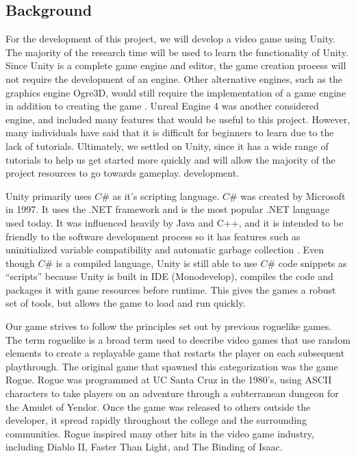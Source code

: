 \documentclass[12pt]{article}       %
\begin{document}
\subsection{Background}
	For the development of this project, we will develop a video game using Unity. The majority of the research time will be used to learn the functionality of Unity. Since Unity is a complete game engine and editor, the game creation process will not require the development of an engine. Other alternative engines, such as the graphics engine Ogre3D, would still require the implementation of a game engine in addition to creating the game \cite{Ogre}. Unreal Engine 4 was another considered engine, and included many features that would be useful to this project. However, many individuals have said that it is difficult for beginners to learn due to the lack of tutorials. Ultimately, we settled on Unity, since it has a wide range of tutorials to help us get started more quickly and will allow the majority of the project resources to go towards gameplay. development.

        Unity primarily uses $C\#$ as it’s scripting language. $C\#$ was created by Microsoft in 1997. It uses the .NET framework and is the most popular .NET language used today. It was influenced heavily by Java and C++, and it is intended to be friendly to the software development process so it has features such as uninitialized variable compatibility and automatic garbage collection \cite{Cadet}. Even though $C\#$ is a compiled language, Unity is still able to use $C\#$ code snippets as “scripts” because Unity is built in IDE (Monodevelop), compiles the code and packages it with game resources before runtime. This gives the games a robust set of tools, but allows the game to load and run quickly. \cite{Moles} 

	Our game strives to follow the principles set out by previous roguelike games. The term roguelike is a broad term used to describe video games that use random elements to create a replayable game that restarts the player on each subsequent playthrough. The original game that spawned this categorization was the game Rogue. Rogue was programmed at UC Santa Cruz in the 1980’s, using ASCII characters to take players on an adventure through a subterranean dungeon for the Amulet of Yendor. Once the game was released to others outside the developer, it spread rapidly throughout the college and the surrounding communities. Rogue inspired many other hits in the video game industry, including Diablo II, Faster Than Light, and The Binding of Isaac. \cite{Rogue}
\end{document}

